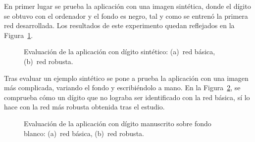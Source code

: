 En primer lugar se prueba la aplicación con una imagen sintética, donde el dígito se obtuvo con el ordenador y el fondo es negro, tal y como se entrenó la primera red desarrollada. Los resultados de este experimento quedan reflejados en la Figura~\ref{fig.experimento1}.

\begin{figure}[H]
	\centering
	 \hspace{5pt}
	\caption{Evaluación de la aplicación con dígito sintético: (a)~red básica, (b)~red robusta.}
	\label{fig.experimento1}
\end{figure}

Tras evaluar un ejemplo sintético se pone a prueba la aplicación con una imagen más complicada, variando el fondo y escribiéndolo a mano. En la Figura~\ref{fig.experimento}, se comprueba cómo un dígito que no lograba ser identificado con la red básica, sí lo hace con la red más robusta obtenida tras el estudio. 

\begin{figure}[H]
	\centering
	 \hspace{5pt}
	\caption{Evaluación de la aplicación con dígito manuscrito sobre fondo blanco: (a)~red básica, (b)~red robusta.}
	\label{fig.experimento}
\end{figure}

